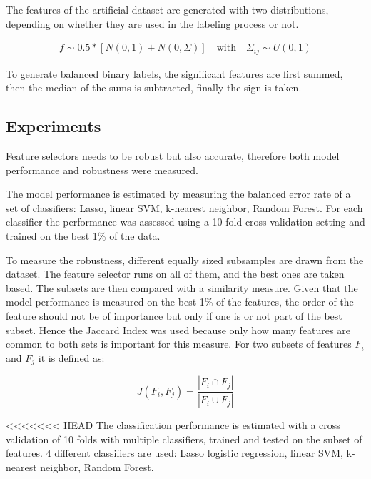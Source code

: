 \documentclass[twoside,11pt]{article}
\begin{document}
{The features of the artificial dataset are generated with two distributions, depending on whether they are used in the labeling process or not.

\begin{align}
f \sim0.5 * \left[ N(0, 1) + N(0, \Sigma) \right]  \quad \text{with} \quad \Sigma_{ij} \sim U(0,1)
\end{align}

To generate balanced binary labels, the significant features are first summed, then the median of the sums is subtracted, finally the sign is taken. 





\subsection{Experiments}

Feature selectors needs to be robust but also accurate, therefore both model performance and robustness were measured.

The model performance is estimated by measuring the balanced error rate of a set of classifiers: Lasso, linear SVM, k-nearest neighbor, Random Forest. For each classifier the performance was assessed using a 10-fold cross validation setting and trained on the best 1\% of the data.

To measure the robustness, different equally sized subsamples are drawn from the dataset. The feature selector runs on all of them, and the best ones are taken based. The subsets are then compared with a similarity measure. Given that the model performance is measured on the best 1\% of the features, the order of the feature should not be of importance but only if one is or not part of the best subset. Hence the Jaccard Index was used because only how many features are common to both sets is important for this measure. For two subsets of features $F_i$ and $F_j$ it is defined as:

\begin{equation}
J(F_i, F_j) = \frac{| F_i \cap F_j |}{| F_i \cup F_j |}
\end{equation}

<<<<<<< HEAD
The classification performance is estimated with a cross validation of 10 folds with multiple classifiers, trained and tested on the subset of features. 4 different classifiers are used: Lasso logistic regression, linear SVM, k-nearest neighbor, Random Forest.

}
\end{document}
